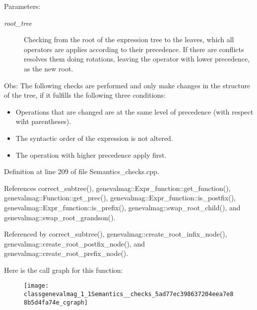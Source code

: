 \begin{Desc}
\item[Parameters:]
\begin{description}
\item[{\em root\_\-tree}]Checking from the root of the expression tree to the leaves, which all operators are applies according to their precedence. If there are conflicts resolves them doing rotations, leaving the operator with lower precedence, as the new root.\end{description}
\end{Desc}
Obs: The following checks are performed and only make changes in the structure of the tree, if it fulfills the following three conditions:

\begin{itemize}
\item Operations that are changed are at the same level of precedence (with respect wiht parentheses).\item The syntactic order of the expression is not altered.\item The operation with higher precedence apply first. \end{itemize}


Definition at line 209 of file Semantics\_\-checks.cpp.

References correct\_\-subtree(), genevalmag::Expr\_\-function::get\_\-function(), genevalmag::Function::get\_\-prec(), genevalmag::Expr\_\-function::is\_\-postfix(), genevalmag::Expr\_\-function::is\_\-prefix(), genevalmag::swap\_\-root\_\-child(), and genevalmag::swap\_\-root\_\-grandson().

Referenced by correct\_\-subtree(), genevalmag::create\_\-root\_\-infix\_\-node(), genevalmag::create\_\-root\_\-postfix\_\-node(), and genevalmag::create\_\-root\_\-prefix\_\-node().

Here is the call graph for this function:\nopagebreak
\begin{figure}[H]
\begin{center}
\leavevmode
\texttt{[image: classgenevalmag\_1\_1Semantics\_\_checks\_5ad77ec398637204eea7e88b5d4fa74e\_cgraph]}
\end{center}
\end{figure}


